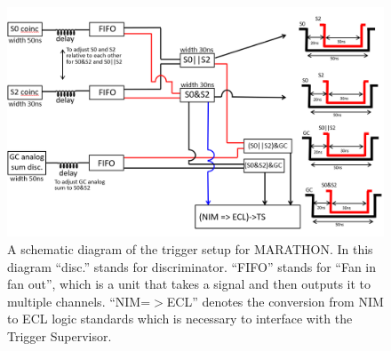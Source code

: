 \begin{figure}
\begin{center}
	\includegraphics[width=\textwidth]{./setup/fig/trigger_diagram.png}
	\caption{A schematic diagram of the trigger setup for MARATHON. In this diagram ``disc.'' stands for discriminator. ``FIFO'' stands for ``Fan in fan out'', which is a unit that takes a signal and then outputs it to multiple channels. ``NIM=$>$ECL'' denotes the conversion from NIM to ECL logic standards which is necessary to interface with the Trigger Supervisor.\cite{Rey}}
	\label{fig:trig_schem}
\end{center}
\end{figure}